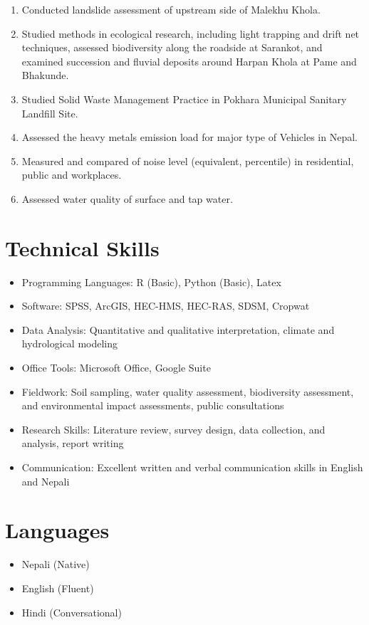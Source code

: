 \documentclass[a4paper,11.5pt]{article}
\begin{document}
\begin{enumerate}
    \item Conducted landslide assessment of upstream side of Malekhu Khola.
    \item Studied methods in ecological research, including light trapping and drift net techniques, assessed biodiversity along the roadside at Sarankot, and examined succession and fluvial deposits around Harpan Khola at Pame and Bhakunde.
    \item Studied Solid Waste Management Practice in Pokhara Municipal Sanitary Landfill Site.
    \item Assessed the heavy metals emission load for major type of Vehicles in Nepal.
    \item Measured and compared of noise level (equivalent, percentile) in residential, public and workplaces.
    \item Assessed water quality of surface and tap water.
 
\end{enumerate}

\section{Technical Skills}
\begin{itemize}
    \item Programming Languages: R (Basic), Python (Basic), Latex
    \item Software: SPSS, ArcGIS, HEC-HMS, HEC-RAS, SDSM, Cropwat
    \item Data Analysis: Quantitative and qualitative interpretation, climate and hydrological modeling
    \item Office Tools: Microsoft Office, Google Suite
    \item Fieldwork: Soil sampling, water quality assessment, biodiversity assessment, and environmental impact assessments, public consultations
    \item Research Skills: Literature review, survey design, data collection, and analysis, report writing
    \item Communication: Excellent written and verbal communication skills in English and Nepali
\end{itemize}

\section{Languages}
\begin{multicols}{3}
\begin{itemize}
    \item Nepali (Native)
    \item English (Fluent)
    \item Hindi (Conversational)
\end{itemize}
\end{multicols}
\end{document}
